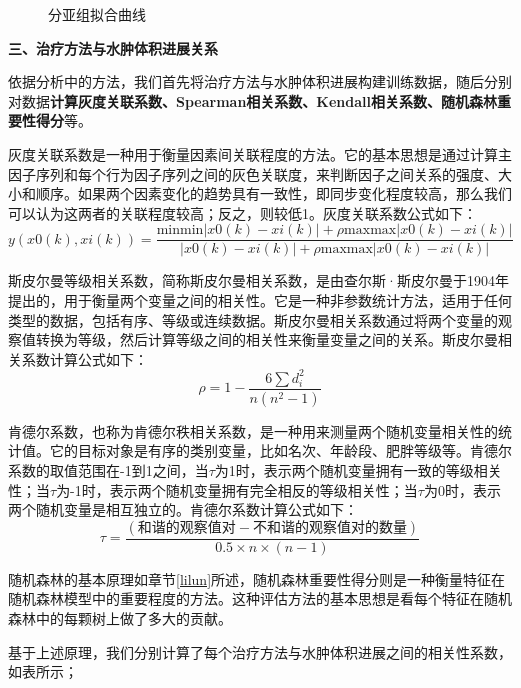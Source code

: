 \documentclass[bwprint]{gmcmthesis}
\begin{document}
				\begin{figure}[H]
					\centering
					\qquad
					\qquad
					\caption{分亚组拟合曲线}
					\label{fig:12}
				\end{figure}
				
				\textbf{三、治疗方法与水肿体积进展关系}
				
				依据分析中的方法，我们首先将治疗方法与水肿体积进展构建训练数据，随后分别对数据\textbf{计算灰度关联系数、Spearman相关系数、Kendall相关系数、随机森林重要性得分}等。
				
				灰度关联系数是一种用于衡量因素间关联程度的方法。它的基本思想是通过计算主因子序列和每个行为因子序列之间的灰色关联度，来判断因子之间关系的强度、大小和顺序。如果两个因素变化的趋势具有一致性，即同步变化程度较高，那么我们可以认为这两者的关联程度较高；反之，则较低1。灰度关联系数公式如下：
				\[
				y(x0(k),xi(k))=\frac{\mathrm{minmin}|x0(k)-xi(k)|+\rho\mathrm{maxmax}|x0(k)-xi(k)|}{|x0(k)-xi(k)|+\rho\mathrm{maxmax}|x0(k)-xi(k)|}
				\]
				
				斯皮尔曼等级相关系数，简称斯皮尔曼相关系数，是由查尔斯·斯皮尔曼于1904年提出的，用于衡量两个变量之间的相关性。它是一种非参数统计方法，适用于任何类型的数据，包括有序、等级或连续数据。斯皮尔曼相关系数通过将两个变量的观察值转换为等级，然后计算等级之间的相关性来衡量变量之间的关系。斯皮尔曼相关系数计算公式如下：
				\[
				\rho=1-\frac{6\sum d_{i}^{2}}{n(n^{2}-1)}
				\]
				
				肯德尔系数，也称为肯德尔秩相关系数，是一种用来测量两个随机变量相关性的统计值。它的目标对象是有序的类别变量，比如名次、年龄段、肥胖等级等。肯德尔系数的取值范围在-1到1之间，当$\tau$为1时，表示两个随机变量拥有一致的等级相关性；当$\tau$为-1时，表示两个随机变量拥有完全相反的等级相关性；当$\tau$为0时，表示两个随机变量是相互独立的。肯德尔系数计算公式如下：
				\[
				\tau=\frac{(\text{和谐的观察值对}-\text{不和谐的观察值对的数量})}{0.5\times n\times(n-1)}
				\]
				
				随机森林的基本原理如章节\ref{lilun}所述，随机森林重要性得分则是一种衡量特征在随机森林模型中的重要程度的方法。这种评估方法的基本思想是看每个特征在随机森林中的每颗树上做了多大的贡献。
				
				基于上述原理，我们分别计算了每个治疗方法与水肿体积进展之间的相关性系数，如表所示；
				
\end{document}
